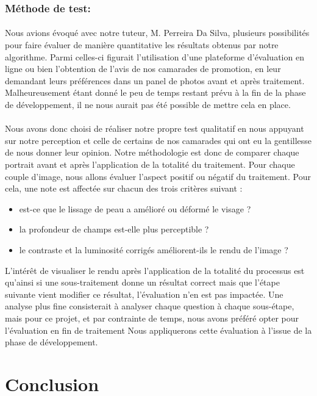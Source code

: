 \documentclass[11pt, french]{report-rd-info}
\begin{document}
\subsubsection{Méthode de test:}
\paragraph*{}
Nous avions évoqué avec notre tuteur, M. Perreira Da Silva, plusieurs possibilités pour faire évaluer de manière quantitative les résultats obtenus par notre algorithme.
Parmi celles-ci figurait l'utilisation d'une plateforme d'évaluation en ligne ou bien l'obtention de l'avis de nos camarades de promotion, en leur demandant leurs préférences dans un panel de photos avant et après traitement.
Malheureusement étant donné le peu de temps restant prévu à la fin de la phase de développement, il ne nous aurait pas été possible de mettre cela en place.
\paragraph*{}
Nous avons donc choisi de réaliser notre propre test qualitatif en nous appuyant sur notre perception et celle de certains de nos camarades qui ont eu la gentillesse de nous donner leur opinion.
Notre méthodologie est donc de comparer chaque portrait avant et après l'application de la totalité du traitement. Pour chaque couple d'image, nous allons évaluer l'aspect positif ou négatif du traitement. Pour cela, une note est affectée sur chacun des trois critères suivant :
\begin{itemize}
\item est-ce que le lissage de peau a amélioré ou déformé le visage ?
\item la profondeur de champs est-elle plus perceptible ?
\item le contraste et la luminosité corrigés améliorent-ils le rendu de l'image ?
\end{itemize}

L'intérêt de visualiser le rendu après l'application de la totalité du processus est qu'ainsi si une sous-traitement donne un résultat correct mais que l'étape suivante vient modifier ce résultat, l’évaluation n’en est pas impactée. Une analyse plus fine consisterait à analyser chaque question à chaque sous-étape, mais pour ce projet, et par contrainte de temps, nous avons préféré opter pour l’évaluation en fin de traitement
Nous appliquerons cette évaluation à l’issue de la phase de développement.


\section{Conclusion}
\end{document}
